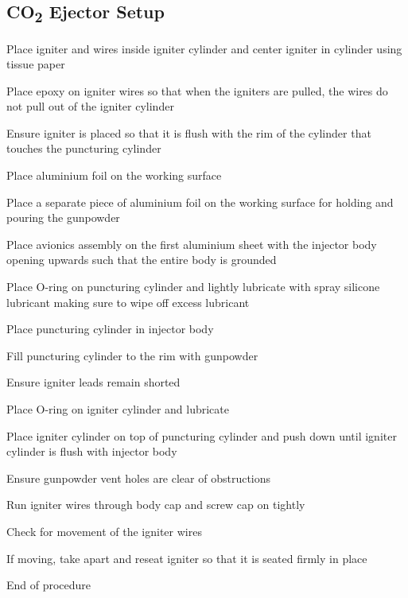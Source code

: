     \subsection{CO\textsubscript{2} Ejector Setup}
        \begin{checklist}
            \item Place igniter and wires inside igniter cylinder and center igniter in cylinder using tissue paper
            \item Place epoxy on igniter wires so that when the igniters are pulled, the wires do not pull out of the igniter cylinder
            \item Ensure igniter is placed so that it is flush with the rim of the cylinder that touches the puncturing cylinder
            \item Place aluminium foil on the working surface
            \item Place a separate piece of aluminium foil on the working surface for holding and pouring the gunpowder
            \item Place avionics assembly on the first aluminium sheet with the injector body opening upwards such that the entire body is grounded
            \item Place O-ring on puncturing cylinder and lightly lubricate with spray silicone lubricant making sure to wipe off excess lubricant
            \item Place puncturing cylinder in injector body
            \item Fill puncturing cylinder to the rim with gunpowder
            \item Ensure igniter leads remain shorted
            \item Place O-ring on igniter cylinder and lubricate
            \item Place igniter cylinder on top of puncturing cylinder and push down until igniter cylinder is flush with injector body
            \item Ensure gunpowder vent holes are clear of obstructions
            \item Run igniter wires through body cap and screw cap on tightly
            \item Check for movement of the igniter wires
            \item If moving, take apart and reseat igniter so that it is seated firmly in place
            \item End of procedure
        \end{checklist}


